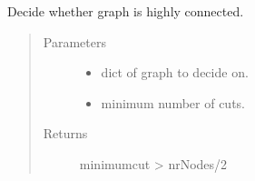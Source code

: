 \documentclass[letterpaper,10pt,english]{sphinxmanual}
\begin{document}
\begin{fulllineitems}
\label{\detokenize{clustering:clustering.highlyConnected}}
\sphinxAtStartPar
Decide whether graph is highly connected.
\begin{quote}\begin{description}
\item[{Parameters}] \leavevmode\begin{itemize}
\item {} 
\sphinxAtStartPar
{} \textendash{} dict of graph to decide on.

\item {} 
\sphinxAtStartPar
{} \textendash{} minimum number of cuts.

\end{itemize}

\item[{Returns}] \leavevmode
\sphinxAtStartPar
minimumcut \textgreater{} nrNodes/2

\end{description}\end{quote}

\end{fulllineitems}

\end{document}
